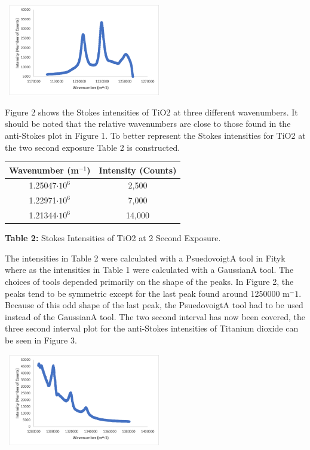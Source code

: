 \documentclass[12pt]{article}
\begin{document}
\begin{multicols}{2}
\begin{center}
    \includegraphics[width=7cm, height=4cm]{PHYS 331 RS TiO2 Stokes Wavnumber (2 Sec).png}
    \caption{\textbf{\small{Figure 2:}} \small{Stokes Intensities of TiO2 at 2 Second Exposure.}}
\end{center}
Figure 2 shows the Stokes intensities of TiO2 at three different wavenumbers. It should be noted that the relative wavenumbers are close to those found in the anti-Stokes plot in Figure 1. To better represent the Stokes intensities for TiO2 at the two second exposure Table 2 is constructed.
\newline
\begin{tabular}{|c|c|}
    \hline \textbf{Wavenumber (m$^{-1}$)} & \textbf{Intensity (Counts)} \\ \hline
    1.25047$\cdot10^6$ & 2,500 \\ \hline
    1.22971$\cdot10^6$ & 7,000 \\ \hline
    1.21344$\cdot10^6$ & 14,000 \\ \hline
\end{tabular}
\centerline{\tiny{\textbf{Table 2:}} \tiny{Stokes Intensities of TiO2 at 2 Second Exposure.}}
\newline
The intensities in Table 2 were calculated with a PsuedovoigtA tool in Fityk where as the intensities in Table 1 were calculated with a GaussianA tool. The choices of tools depended primarily on the shape of the peaks. In Figure 2, the peaks tend to be symmetric except for the last peak found around 1250000 m$^-1$. Because of this odd shape of the last peak, the PsuedovoigtA tool had to be used instead of the GaussianA tool. The two second interval has now been covered, the three second interval plot for the anti-Stokes intensities of Titanium dioxide can be seen in Figure 3.
\begin{center}
    \includegraphics[width=7cm, height=4cm]{PHYS 331 RS TiO2 Antistokes Wavnumber (3 Sec).png}

\end{center}
\end{multicols}
\end{document}
